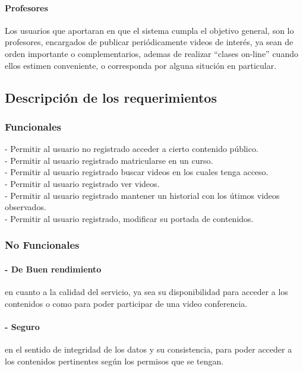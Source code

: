 \documentclass[12pt]{article}
\begin{document}
\paragraph{Profesores\\}

Los usuarios que aportaran en que el sistema cumpla el objetivo general, son lo profesores, 
encargados de publicar periódicamente videos de interés, ya sean de orden importante o complementarios, 
ademas de realizar ``clases on-line'' cuando ellos estimen conveniente, o corresponda por alguna situción
en particular.
\subsection{Descripción de los requerimientos}
\subsubsection{Funcionales}

- Permitir al usuario no registrado acceder a cierto contenido público.\\

- Permitir al usuario registrado matricularse en un curso.\\

- Permitir al usuario registrado buscar videos en los cuales tenga acceso.\\

- Permitir al usuario registrado ver videos.\\

- Permitir al usuario registrado mantener un historial con los útimos videos observados.\\ 

- Permitir al usuario registrado, modificar su portada de contenidos.\\
\newpage
\subsubsection{No Funcionales}

\paragraph{- De Buen rendimiento} en cuanto a la calidad del servicio, ya sea su disponibilidad para acceder a los 
contenidos o como para poder participar de una video conferencia.\\

\paragraph{- Seguro} en el sentido de integridad de los datos y su consistencia, para poder acceder a los contenidos
pertinentes según los permisos que se tengan.\\
\end{document}
